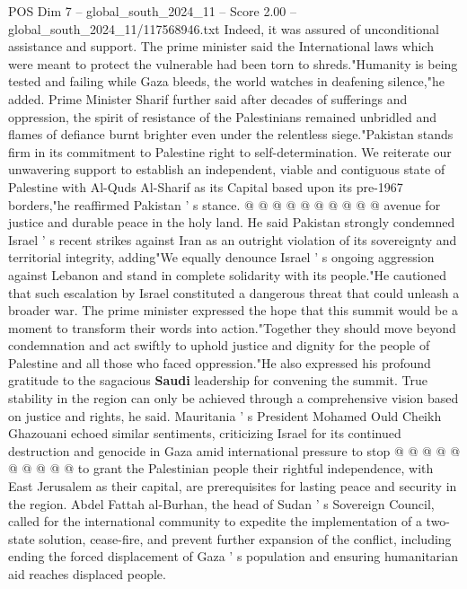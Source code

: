 \begin{textsample}{POS Dim 7 – global\_south\_2024\_11 – Score 2.00 – global\_south\_2024\_11/117568946.txt}
Indeed, it was assured of unconditional assistance and support.
The prime minister said the International laws which were meant to protect the vulnerable had been torn to shreds."Humanity is being tested and failing while Gaza bleeds, the world watches in deafening silence,"he added.
Prime Minister Sharif further said after decades of sufferings and oppression, the spirit of resistance of the Palestinians remained unbridled and flames of defiance burnt brighter even under the relentless siege."Pakistan stands firm in its commitment to Palestine right to self-determination.
We reiterate our unwavering support to establish an independent, viable and contiguous state of Palestine with Al-Quds Al-Sharif as its Capital based upon its pre-1967 borders,"he reaffirmed Pakistan ' s stance. @ @ @ @ @ @ @ @ @ @ avenue for justice and durable peace in the holy land.
He said Pakistan strongly condemned Israel ' s recent strikes against Iran as an outright violation of its sovereignty and territorial integrity, adding"We equally denounce Israel ' s ongoing aggression against Lebanon and stand in complete solidarity with its people."He cautioned that such escalation by Israel constituted a dangerous threat that could unleash a broader war.
The prime minister expressed the hope that this summit would be a moment to transform their words into action."Together they should move beyond condemnation and act swiftly to uphold justice and dignity for the people of Palestine and all those who faced oppression."He also expressed his profound gratitude to the sagacious \textbf{Saudi} leadership for convening the summit.
True stability in the region can only be achieved through a comprehensive vision based on justice and rights, he said.
Mauritania ' s President Mohamed Ould Cheikh Ghazouani echoed similar sentiments, criticizing Israel for its continued destruction and genocide in Gaza amid international pressure to stop @ @ @ @ @ @ @ @ @ @ to grant the Palestinian people their rightful independence, with East Jerusalem as their capital, are prerequisites for lasting peace and security in the region.
Abdel Fattah al-Burhan, the head of Sudan ' s Sovereign Council, called for the international community to expedite the implementation of a two-state solution, cease-fire, and prevent further expansion of the conflict, including ending the forced displacement of Gaza ' s population and ensuring humanitarian aid reaches displaced people.

\end{textsample}
